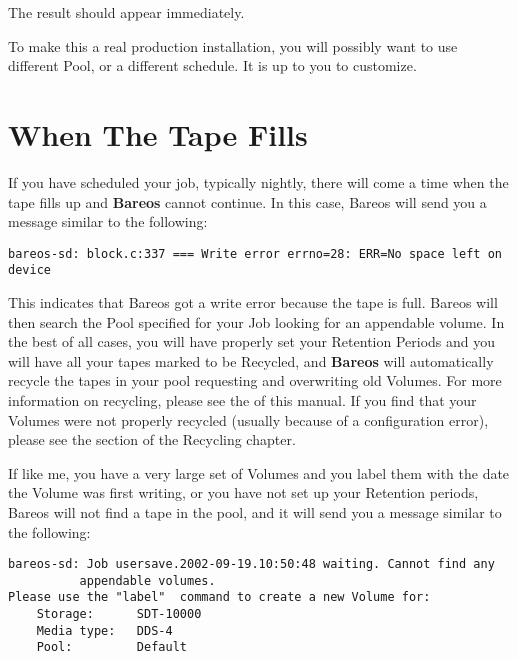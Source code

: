 The result should appear immediately.

To make this a real production installation, you will possibly want to use
different Pool, or a different schedule. It is up to you to customize.


\section{When The Tape Fills}
\label{FullTape}

If you have scheduled your job, typically nightly, there will come a time when
the tape fills up and {\bf Bareos} cannot continue. In this case, Bareos will
send you a message similar to the following:

\footnotesize
\begin{verbatim}
bareos-sd: block.c:337 === Write error errno=28: ERR=No space left on device
\end{verbatim}
\normalsize

This indicates that Bareos got a write error because the tape is full. Bareos
will then search the Pool specified for your Job looking for an appendable
volume. In the best of all cases, you will have properly set your Retention
Periods and you will have all your tapes marked to be Recycled, and {\bf
Bareos} will automatically recycle the tapes in your pool requesting and
overwriting old Volumes. For more information on recycling, please see the
 of this manual. If you
find that your Volumes were not properly recycled (usually because of a
configuration error), please see the
 section of
the Recycling chapter.

If like me, you have a very large set of Volumes and you label them with the
date the Volume was first writing, or you have not set up your Retention
periods, Bareos will not find a tape in the pool, and it will send you a
message similar to the following:

\footnotesize
\begin{verbatim}
bareos-sd: Job usersave.2002-09-19.10:50:48 waiting. Cannot find any
          appendable volumes.
Please use the "label"  command to create a new Volume for:
    Storage:      SDT-10000
    Media type:   DDS-4
    Pool:         Default
\end{verbatim}
\normalsize

